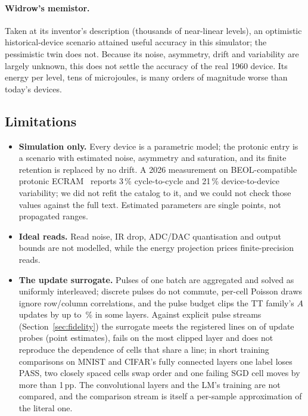 \paragraph{Widrow's memistor.} Taken at its inventor's description (thousands of near-linear levels), an optimistic
historical-device scenario attained useful accuracy in this simulator; the pessimistic twin does not. Because its noise,
asymmetry, drift and variability are largely unknown, this does not settle the accuracy of the real 1960 device. Its energy per
level, tens of microjoules, is many orders of magnitude worse than today's devices.

\subsection{Limitations}\label{sec:limits}
\begin{itemize}
\item \textbf{Simulation only.} Every device is a parametric model; the protonic entry is a scenario with estimated noise,
      asymmetry and saturation, and its finite retention is replaced by no drift. A 2026 measurement on BEOL-compatible
      protonic ECRAM~\cite{xu2026} reports 3\,\% cycle-to-cycle and 21\,\% device-to-device variability; we did not refit the
      catalog to it, and we could not check those values against the full text. Estimated parameters are single points, not
      propagated ranges.
\item \textbf{Ideal reads.} Read noise, IR drop, ADC/DAC quantisation and output bounds are not modelled, while the energy
      projection prices finite-precision reads.
\item \textbf{The update surrogate.} Pulses of one batch are aggregated and solved as uniformly interleaved; discrete pulses do
      not commute, per-cell Poisson draws ignore row/column correlations, and the pulse budget clips the TT family's $A$
      updates by up to \RVLostCifarTtLayerMeanMaxPct\,\% in some layers. Against explicit pulse streams
      (Section~\ref{sec:fidelity}) the surrogate meets the registered lines on \RYProbeSurMeetsN{} of \RYProbeN{} update probes
      (point estimates), fails on the most clipped layer and does not reproduce the dependence of cells that share a line; in
      short training comparisons on MNIST and CIFAR's fully connected layers one label loses PASS, two closely spaced cells swap
      order and one failing SGD cell moves by more than 1\,pp. The convolutional layers and the LM's training are not compared,
      and the comparison stream is itself a per-sample approximation of the literal one.

\end{itemize}
